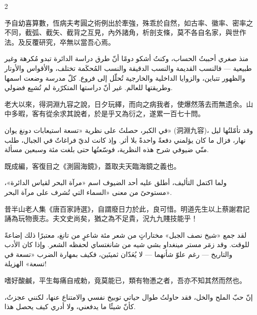 \documentclass[11pt,a4paper]{article}
\newcommand{\ar}[1]{\arabicfont\beginR #1\endR}
\begin{document}
\begin{paracol}{2}
\switchcolumn*

{\color{prefacecolor}
予自幼喜算數，恆病夫考圓之術例出於牽強，殊乖於自然，如古率、徽率、密率之不同，截弧、截矢、截背之互見，內外諸角，析剖支條，莫不各自名家，與世作法。及反覆研究，卒無以當吾心焉。
}

\switchcolumn

\ar{منذ صغري أحببتُ الحساب، وكنتُ أشكو دومًا أنّ طرق دراسة الدائرة تبدو مُكرهة وغير طبيعية — فالنسب القديمة والنسب الدقيقة والنسب المُحكَمة تختلف، والأقواس والأوتار والظهور تتباين، والزوايا الداخلية والخارجية تُحلّل إلى فروع. كلّ مدرسة وضعت اسمها وطريقتها للعالم. غير أنّ دراستها المتكرّرة لم تُشبِع فضولي.}

\switchcolumn*

{\color{prefacecolor}
老大以來，得洞淵九容之說，日夕玩繹，而向之病我者，使爆然落去而無遗余。山中多暇，客有從余求其說者，於是乎又為衍之，遂累一百七十問。
}

\switchcolumn

\ar{في الكبر، حصلتُ على نظرية «تسعة استيعابات دونغ يوان» (洞淵九容)، وقد تأمّلتُها ليل نهار، فزال ما كان يؤلمني دفعةً واحدةً بلا أثر. وإذ كانت لديّ فراغاتٌ في الجبال، طلب منّي ضيوفي شرح هذه النظرية، فوسّعتُها حتى بلغت مئة وسبعين مسألة.}

\switchcolumn*

{\color{prefacecolor}
既成編，客復目之《測圓海鏡》，蓋取夫天臨海鏡之義也。
}

\switchcolumn

\ar{ولما اكتمل التأليف، أطلق عليه أحد الضيوف اسم «مرآة البحر لقياس الدائرة»، مستوحىً من معنى «السماء التي تُشرف على مرآة البحر».}

\switchcolumn*

{\color{prefacecolor}
昔半山老人集《唐百家詩選》，自謂廢日力於此，良可惜。明道先生以上蔡謝君記誦為玩物喪志。夫文史尚矣，猶之為不足貴，況九九賤技能乎！
}

\switchcolumn

\ar{لقد جمع «شيخ نصف الجبل» مختاراتٍ من شعر مئة شاعرٍ من تانغ، معتبرًا ذلك إضاعةً للوقت. وقد زمَر مستر مينغداو بشي شيه من شانغتساي لحفظه الشعر. وإذا كان الأدب والتاريخ — رغم علوّ شأنهما — لا يُعَدّان ثمينَين، فكيف بمهارة الضرب «تسعة في تسعة» الهزيلة!}

\switchcolumn*

{\color{prefacecolor}
嗜好酸鹹，平生每痛自戒勅，竟莫能已，類有物慿之者，吾亦不知其然而然也。
}

\switchcolumn

\ar{إنّ حبّ الملح والخل، فقد حاولتُ طوال حياتي توبيخ نفسي والامتناع عنها، لكنني عجزتُ، كأنّ شيئًا ما يدفعني، ولا أدري كيف يحصل هذا.}


\end{paracol}
\end{document}
